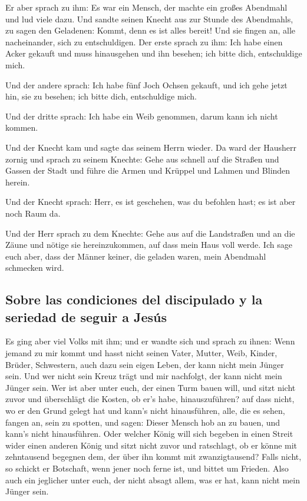  Er aber sprach zu ihm: Es war ein Mensch, der machte ein
großes Abendmahl und lud viele dazu.  Und sandte seinen
Knecht aus zur Stunde des Abendmahls, zu sagen den Geladenen: Kommt,
denn es ist alles bereit!  Und sie fingen an, alle
nacheinander, sich zu entschuldigen. Der erste sprach zu ihm: Ich habe
einen Acker gekauft und muss hinausgehen und ihn besehen; ich bitte
dich, entschuldige mich.

 Und der andere sprach: Ich habe fünf Joch Ochsen
gekauft, und ich gehe jetzt hin, sie zu besehen; ich bitte dich,
entschuldige mich.

 Und der dritte sprach: Ich habe ein Weib genommen, darum
kann ich nicht kommen.

 Und der Knecht kam und sagte das seinem Herrn wieder. Da
ward der Hausherr zornig und sprach zu seinem Knechte: Gehe aus schnell
auf die Straßen und Gassen der Stadt und führe die Armen und Krüppel und
Lahmen und Blinden herein.

 Und der Knecht sprach: Herr, es ist geschehen, was du
befohlen hast; es ist aber noch Raum da.

 Und der Herr sprach zu dem Knechte: Gehe aus auf die
Landstraßen und an die Zäune und nötige sie hereinzukommen, auf dass
mein Haus voll werde.  Ich sage euch aber, dass der
Männer keiner, die geladen waren, mein Abendmahl schmecken wird.

\hypertarget{sobre-las-condiciones-del-discipulado-y-la-seriedad-de-seguir-a-jesuxfas}{%
\subsection{Sobre las condiciones del discipulado y la seriedad de
seguir a
Jesús}\label{sobre-las-condiciones-del-discipulado-y-la-seriedad-de-seguir-a-jesuxfas}}

 Es ging aber viel Volks mit ihm; und er wandte sich und
sprach zu ihnen:  Wenn jemand zu mir kommt und hasst
nicht seinen Vater, Mutter, Weib, Kinder, Brüder, Schwestern, auch dazu
sein eigen Leben, der kann nicht mein Jünger sein.  Und
wer nicht sein Kreuz trägt und mir nachfolgt, der kann nicht mein Jünger
sein.  Wer ist aber unter euch, der einen Turm bauen
will, und sitzt nicht zuvor und überschlägt die Kosten, ob er's habe,
hinauszuführen?  auf dass nicht, wo er den Grund gelegt
hat und kann's nicht hinausführen, alle, die es sehen, fangen an, sein
zu spotten,  und sagen: Dieser Mensch hob an zu bauen,
und kann's nicht hinausführen.  Oder welcher König will
sich begeben in einen Streit wider einen anderen König und sitzt nicht
zuvor und ratschlagt, ob er könne mit zehntausend begegnen dem, der über
ihn kommt mit zwanzigtausend?  Falls nicht, so schickt er
Botschaft, wenn jener noch ferne ist, und bittet um Frieden.
 Also auch ein jeglicher unter euch, der nicht absagt
allem, was er hat, kann nicht mein Jünger sein.

